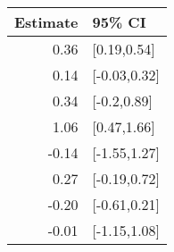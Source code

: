 \begin{tabular}{rl}
  \hline
Estimate & 95\% CI \\ 
  \hline
0.36 & [0.19,0.54] \\ 
  0.14 & [-0.03,0.32] \\ 
  0.34 & [-0.2,0.89] \\ 
  1.06 & [0.47,1.66] \\ 
  -0.14 & [-1.55,1.27] \\ 
  0.27 & [-0.19,0.72] \\ 
  -0.20 & [-0.61,0.21] \\ 
  -0.01 & [-1.15,1.08] \\ 
   \hline
\end{tabular}

